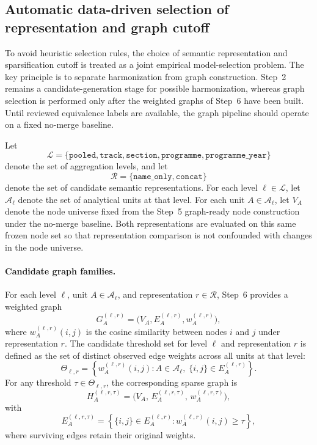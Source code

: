 \subsection{Automatic data-driven selection of representation and graph cutoff}
\label{sec:automatic_selection}

To avoid heuristic selection rules, the choice of semantic representation and sparsification cutoff
is treated as a joint empirical model-selection problem. The key principle is to separate
harmonization from graph construction. Step~2 remains a candidate-generation stage for possible
harmonization, whereas graph selection is performed only after the weighted graphs of Step~6
have been built. Until reviewed equivalence labels are available, the graph pipeline should
operate on a fixed no-merge baseline.

Let
\[
\mathcal{L}
=
\{\texttt{pooled},\texttt{track},\texttt{section},\texttt{programme},\texttt{programme\_year}\}
\]
denote the set of aggregation levels, and let
\[
\mathcal{R}
=
\{\texttt{name\_only},\texttt{concat}\}
\]
denote the set of candidate semantic representations. For each level
\(\ell \in \mathcal{L}\), let \(\mathcal{A}_{\ell}\) denote the set of analytical units at that
level. For each unit \(A \in \mathcal{A}_{\ell}\), let \(V_A\) denote the node universe fixed from
the Step~5 graph-ready node construction under the no-merge baseline. Both representations are
evaluated on this same frozen node set so that representation comparison is not confounded with
changes in the node universe.

\paragraph{Candidate graph families.}
For each level \(\ell\), unit \(A \in \mathcal{A}_{\ell}\), and representation
\(r \in \mathcal{R}\), Step~6 provides a weighted graph
\[
G^{(\ell,r)}_{A}
=
\bigl(V_A,E^{(\ell,r)}_A,w^{(\ell,r)}_A\bigr),
\]
where \(w^{(\ell,r)}_A(i,j)\) is the cosine similarity between nodes \(i\) and \(j\) under
representation \(r\). The candidate threshold set for level \(\ell\) and representation \(r\) is
defined as the set of distinct observed edge weights across all units at that level:
\[
\Theta_{\ell,r}
=
\left\{
w^{(\ell,r)}_A(i,j)
:
A \in \mathcal{A}_{\ell},\;
\{i,j\} \in E^{(\ell,r)}_A
\right\}.
\]
For any threshold \(\tau \in \Theta_{\ell,r}\), the corresponding sparse graph is
\[
H^{(\ell,r,\tau)}_A
=
\bigl(
V_A,\,
E^{(\ell,r,\tau)}_A,\,
w^{(\ell,r,\tau)}_A
\bigr),
\]
with
\[
E^{(\ell,r,\tau)}_A
=
\left\{
\{i,j\} \in E^{(\ell,r)}_A
:
w^{(\ell,r)}_A(i,j) \ge \tau
\right\},
\]
where surviving edges retain their original weights.

